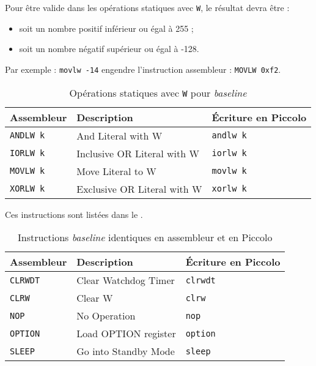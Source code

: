Pour être valide dans les opérations statiques avec \texttt{W}, le résultat devra être :
\begin{itemize}
  \item soit un nombre positif inférieur ou égal à 255 ;
  \item soit un nombre négatif supérieur ou égal à -128.
\end{itemize}

Par exemple : \texttt{movlw -14} engendre l’instruction assembleur : \texttt{MOVLW 0xf2}.


\begin{table}[!ht]
  \centering
  \small
  \begin{tabular}{lll}
    \textbf{Assembleur} & \textbf{Description} & \textbf{Écriture en Piccolo}\\
    \hline
    \texttt{ANDLW k} & And Literal with W & \texttt{andlw k}\\
    \texttt{IORLW k} & Inclusive OR Literal with W & \texttt{iorlw k}\\
    \texttt{MOVLW k} & Move Literal to W & \texttt{movlw k}\\
    \texttt{XORLW k} & Exclusive OR Literal with W & \texttt{xorlw k}\\
    \hline
  \end{tabular}
  \caption{Opérations statiques avec \texttt{W} pour \emph{baseline}}
\end{table}



Ces instructions sont listées dans le .

\begin{table}[!ht]
  \centering
  \small
  \begin{tabular}{lll}
    \textbf{Assembleur} & \textbf{Description} & \textbf{Écriture en Piccolo}\\
    \hline
    \texttt{CLRWDT} & Clear Watchdog Timer & \texttt{clrwdt}\\
    \texttt{CLRW} & Clear W & \texttt{clrw}\\
    \texttt{NOP} & No Operation & \texttt{nop}\\
    \texttt{OPTION} & Load OPTION register & \texttt{option}\\
    \texttt{SLEEP} & Go into Standby Mode & \texttt{sleep}\\
    \hline
  \end{tabular}
  \caption{Instructions \emph{baseline} identiques en assembleur et en Piccolo}
\end{table}















